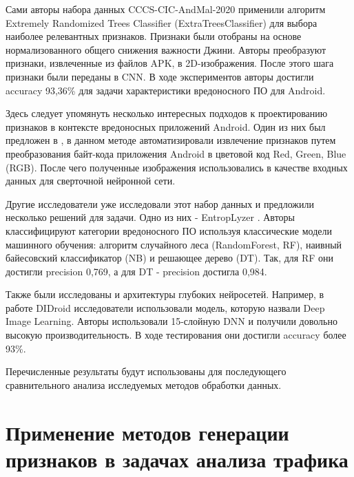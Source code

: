 Сами авторы набора данных CCCS-CIC-AndMal-2020 \cite{Rahali2021} применили алгоритм Extremely Randomized Trees Classifier (ExtraTreesClassifier) \cite{extra_tree} для выбора наиболее релевантных признаков. Признаки были отобраны на основе нормализованного общего снижения важности Джини. Авторы преобразуют признаки, извлеченные из файлов APK, в 2D-изображения. После этого шага признаки были переданы в CNN. В ходе экспериментов авторы достигли accuracy 93,36\% для задачи характеристики вредоносного ПО для Android.


Здесь следует упомянуть несколько интересных подходов к проектированию признаков в контексте вредоносных приложений Android. Один из них был предложен в \cite{Huang2018}, в данном методе автоматизировали извлечение признаков путем преобразования байт-кода приложения Android в цветовой код Red, Green, Blue (RGB). После чего полученные изображения использовались в качестве входных данных для сверточной нейронной сети.


Другие исследователи уже исследовали этот набор данных и предложили несколько решений для задачи. Одно из них - EntropLyzer \cite{Keyes2021}. Авторы классифицируют категории вредоносного ПО используя классические модели машинного обучения: алгоритм случайного леса (RandomForest, RF), наивный байесовский классификатор (NB) и решающее дерево (DT). Так, для RF они достигли precision 0,769, а для  DT - precision достигла 0,984.

Также были исследованы и архитектуры глубоких нейросетей. Например, в работе DIDroid \cite{Rahali2021} исследователи использовали модель, которую назвали Deep Image Learning. Авторы использовали 15-слойную DNN и получили довольно высокую производительность. В ходе тестирования они достигли accuracy более 93\%.

Перечисленные результаты будут использованы для последующего сравнительного анализа исследуемых методов обработки данных.


\section{Применение методов генерации признаков в задачах анализа трафика }\label{sec:ch2/sect2}

